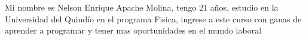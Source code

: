 Mi nombre es Nelson Enrique Apache Molina, tengo 21 años, estudio en la Universidad del Quindío en el programa Fisica, ingrese a este curso con ganas de aprender a programar
y tener mas oportunidades en el mundo laboral

